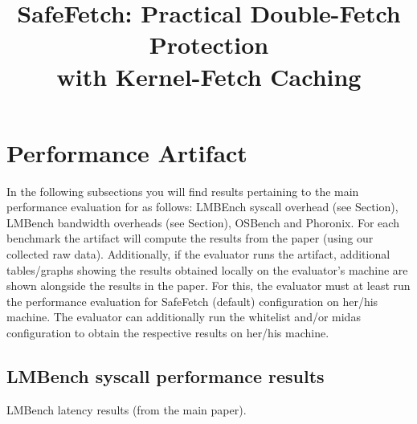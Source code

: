 \let\origthelstnumber\thelstnumber
\makeatletter
\newcommand*\Suppressnumber{%
  \lst@AddToHook{OnNewLine}{%
    \let\thelstnumber\relax%
     \advance\c@lstnumber-\@ne\relax%
    }%
}

\newcommand*\Reactivatenumber[1]{%
  \setcounter{lstnumber}{\numexpr#1-1\relax}
  \lst@AddToHook{OnNewLine}{%
   \let\thelstnumber\origthelstnumber%
   \refstepcounter{lstnumber}%
  }%
}


\makeatother

\makeatletter
\newcommand{\setword}[2]{%
  \phantomsection
  #1\def\@currentlabel{\unexpanded{#1}}\label{#2}%
}
\makeatother

\newcommand{\newpar}[1]{\vspace{0.1cm}\noindent\textbf{#1.}\xspace}



\onecolumn
\date{}

\title{\Large \bf SafeFetch: Practical Double-Fetch Protection\\with Kernel-Fetch Caching}

\section{Performance Artifact}
In the following subsections you will find results pertaining to the main performance
evaluation for \tech as follows: LMBEnch syscall overhead (see Section), 
LMBench bandwidth overheads (see Section), OSBench and Phoronix.
For each benchmark the artifact will compute the results from the paper (using our 
collected raw data).
Additionally, if the evaluator runs the artifact, additional tables/graphs showing 
the results obtained locally on the evaluator's machine are shown alongside the 
results in the paper.
For this, the evaluator must at least run the performance evaluation for SafeFetch (default)
configuration on her/his machine.
The evaluator can additionally run the whitelist and/or midas configuration to obtain the 
respective results on her/his machine.
\subsection{LMBench syscall performance results}
\begin{table}[!h]
  \caption{LMBench latency results (from the main paper).}
  \begin{center}
  \resizebox{0.5\columnwidth}{!}{%
  
  }
\end{center}
\label{tab:lmbench-performance-paper}
\end{table}

